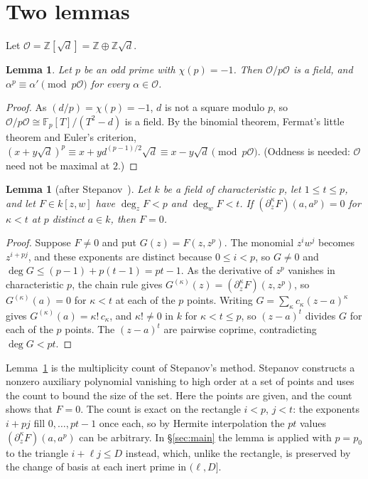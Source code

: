 \documentclass[11pt]{amsart}
\newtheorem{lemma}[theorem]{Lemma}
\theoremstyle{remark}
\newcommand{\Z}{\mathbb{Z}}
\newcommand{\F}{\mathbb{F}}
\newcommand{\cO}{\mathcal{O}}
\newcommand{\sd}{\sqrt{d}}
\begin{document}
\section{Two lemmas}\label{sec:lemmas}

Let $\cO=\Z[\sd]=\Z\oplus\Z\sd$.

\begin{lemma}\label{lem:frob}
Let $p$ be an odd prime with $\chi(p)=-1$. Then $\cO/p\cO$ is a field, and
$\alpha^p\equiv\alpha'\pmod{p\cO}$ for every $\alpha\in\cO$.
\end{lemma}

\begin{proof}
As $(d/p)=\chi(p)=-1$, $d$ is not a square modulo $p$, so $\cO/p\cO\cong\F_p[T]/(T^2-d)$ is a field. By the binomial theorem, Fermat's little
theorem and Euler's criterion, $(x+y\sd)^p\equiv x+yd^{(p-1)/2}\sd\equiv x-y\sd\pmod{p\cO}$. (Oddness is needed: $\cO$ need not be
maximal at $2$.)
\end{proof}

\begin{lemma}[after Stepanov~\cite{Stepanov}]\label{lem:stepanov}
Let $k$ be a field of characteristic $p$, let $1\le t\le p$, and let $F\in k[z,w]$ have $\deg_zF<p$
and $\deg_wF<t$. If $(\partial_z^\kappa F)(a,a^p)=0$ for $\kappa<t$ at $p$ distinct $a\in k$, then $F=0$.
\end{lemma}

\begin{proof}
Suppose $F\ne0$ and put $G(z)=F(z,z^p)$. The monomial $z^iw^j$ becomes $z^{i+pj}$, and these
exponents are distinct because $0\le i<p$, so $G\ne0$ and $\deg G\le(p-1)+p(t-1)=pt-1$. As the
derivative of $z^p$ vanishes in characteristic $p$, the chain rule gives
$G^{(\kappa)}(z)=(\partial_z^\kappa F)(z,z^p)$, so $G^{(\kappa)}(a)=0$ for $\kappa<t$ at each of the
$p$ points. Writing $G=\sum_\kappa c_\kappa(z-a)^\kappa$ gives $G^{(\kappa)}(a)=\kappa!\,c_\kappa$, and
$\kappa!\ne0$ in $k$ for $\kappa<t\le p$, so $(z-a)^t$ divides $G$ for each of the $p$ points. The $(z-a)^t$ are pairwise coprime, contradicting
$\deg G<pt$.
\end{proof}

Lemma~\ref{lem:stepanov} is the multiplicity count of Stepanov's method. Stepanov
constructs a nonzero auxiliary polynomial vanishing to high order at a set of points and uses the count to bound
the size of the set. Here the points are given, and the count shows that $F=0$. The count is exact on the rectangle $i<p$, $j<t$: the exponents
$i+pj$ fill $0,\dots,pt-1$ once each, so by Hermite interpolation the $pt$ values
$(\partial_z^\kappa F)(a,a^p)$ can be arbitrary. In \S\ref{sec:main} the lemma is applied
with $p=p_0$ to the triangle $i+\ell j\le D$ instead, which, unlike the rectangle, is preserved by the change
of basis at each inert prime in $(\ell,D]$.
\end{document}
